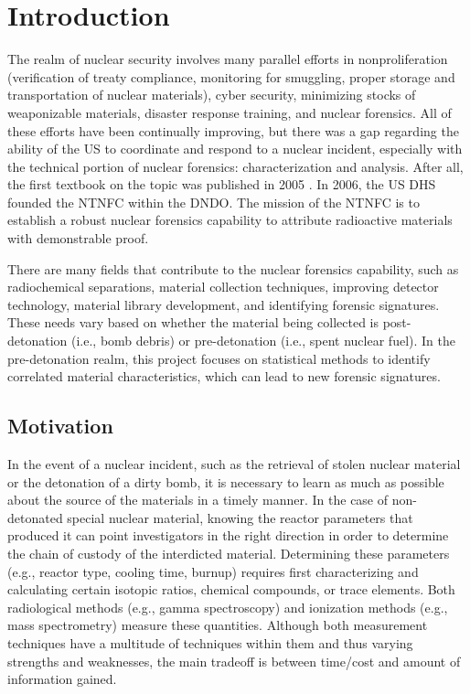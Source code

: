 \chapter{Introduction}
\label{ch:intro}

The realm of nuclear security involves many parallel efforts in
nonproliferation (verification of treaty compliance, monitoring for smuggling,
proper storage and transportation of nuclear materials), cyber security,
minimizing stocks of weaponizable materials, disaster response training, and
nuclear forensics. All of these efforts have been continually improving, but
there was a gap regarding the ability of the \gls{US} to coordinate and respond
to a nuclear incident, especially with the technical portion of nuclear
forensics: characterization and analysis. After all, the first textbook on the
topic was published in 2005 . In 2006, the \gls{US} \gls{DHS}
founded the \gls{NTNFC} within the \gls{DNDO}. The mission of the \gls{NTNFC}
is to establish a robust nuclear forensics capability to attribute radioactive
materials with demonstrable proof.

There are many fields that contribute to the nuclear forensics capability, such
as radiochemical separations, material collection techniques, improving
detector technology, material library development, and identifying forensic
signatures. These needs vary based on whether the material being collected is
post-detonation (i.e., bomb debris) or pre-detonation (i.e., spent nuclear
fuel). In the pre-detonation realm, this project focuses on statistical methods
to identify correlated material characteristics, which can lead to new forensic
signatures. 


\section{Motivation}
\label{sec:motivation}

In the event of a nuclear incident, such as the retrieval of stolen nuclear
material or the detonation of a dirty bomb, it is necessary to learn as much as
possible about the source of the materials in a timely manner. In the case of
non-detonated special nuclear material, knowing the reactor parameters that
produced it can point investigators in the right direction in order to
determine the chain of custody of the interdicted material. Determining these
parameters (e.g., reactor type, cooling time, burnup) requires first
characterizing and calculating certain isotopic ratios, chemical compounds, or
trace elements.  Both radiological methods (e.g., gamma spectroscopy) and
ionization methods (e.g., mass spectrometry) measure these quantities. Although
both measurement techniques have a multitude of techniques within them and thus
varying strengths and weaknesses, the main tradeoff is between time/cost and
amount of information gained. 

